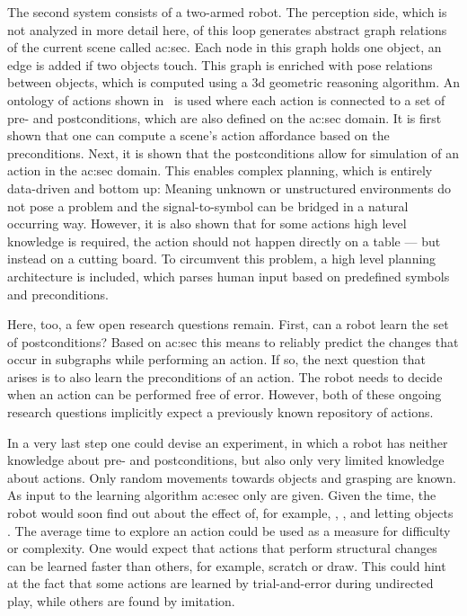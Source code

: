 The second system consists of a two-armed robot.
The perception side, which is not analyzed in more detail here, of this loop generates abstract graph relations of the current scene called \gls{ac:sec}.
Each node in this graph holds one object, an edge is added if two objects touch.
This graph is enriched with pose relations between objects, which is computed using a 3d geometric reasoning algorithm.
An ontology of actions shown in~\cite{worgotter2013simple} is used where each action is connected to a set of pre- and postconditions, which are also defined on the \gls{ac:sec} domain.
It is first shown that one can compute a scene's action affordance based on the preconditions.
Next, it is shown that the postconditions allow for simulation of an action in the \gls{ac:sec} domain.
This enables complex planning, which is entirely data-driven and bottom up: Meaning unknown or unstructured environments do not pose a problem and the signal-to-symbol can be bridged in a natural occurring way.
However, it is also shown that for some actions high level knowledge is required, \eg the action  should not happen directly on a table --- but instead on a cutting board.
To circumvent this problem, a high level planning architecture is included, which parses human input based on predefined symbols and preconditions.


Here, too, a few open research questions remain.
First, can a robot learn the set of postconditions?
Based on \acrlong{ac:sec} this means to reliably predict the changes that occur in subgraphs while performing an action.
If so, the next question that arises is to also learn the preconditions of an action.
The robot needs to decide when an action can be performed free of error.
However, both of these ongoing research questions implicitly expect a previously known repository of actions.


In a very last step one could devise an experiment, in which a robot has neither knowledge about pre- and postconditions, but also only very limited knowledge about actions.
Only random movements towards objects and grasping are known.
As input to the learning algorithm  \gls{ac:esec} only are given.
Given the time, the robot would soon find out about the effect of, for example, , , and letting objects .
The average time to explore an action could be used as a measure for difficulty or complexity.
One would expect that actions that perform structural changes can be learned faster than others, for example, scratch or draw.
This could hint at the fact that some actions are learned by trial-and-error during undirected play, while others are found by imitation.
